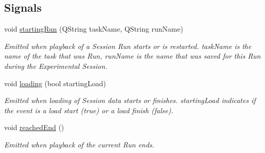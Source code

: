 \subsection*{Signals}
\begin{DoxyCompactItemize}
\item 
\hypertarget{class_picto_1_1_session_player_af6e2ed1e376e9d940c8f5554efbf753b}{void \hyperlink{class_picto_1_1_session_player_af6e2ed1e376e9d940c8f5554efbf753b}{starting\-Run} (Q\-String task\-Name, Q\-String run\-Name)}\label{class_picto_1_1_session_player_af6e2ed1e376e9d940c8f5554efbf753b}

\begin{DoxyCompactList}\small\item\em Emitted when playback of a Session Run starts or is restarted. task\-Name is the name of the task that was Run, run\-Name is the name that was saved for this Run during the Experimental Session. \end{DoxyCompactList}\item 
\hypertarget{class_picto_1_1_session_player_a7419758edb2920b408443d2683d8d029}{void \hyperlink{class_picto_1_1_session_player_a7419758edb2920b408443d2683d8d029}{loading} (bool starting\-Load)}\label{class_picto_1_1_session_player_a7419758edb2920b408443d2683d8d029}

\begin{DoxyCompactList}\small\item\em Emitted when loading of Session data starts or finishes. starting\-Load indicates if the event is a load start (true) or a load finish (false). \end{DoxyCompactList}\item 
\hypertarget{class_picto_1_1_session_player_a37f89e41b206df6d3e88611f9638a394}{void \hyperlink{class_picto_1_1_session_player_a37f89e41b206df6d3e88611f9638a394}{reached\-End} ()}\label{class_picto_1_1_session_player_a37f89e41b206df6d3e88611f9638a394}

\begin{DoxyCompactList}\small\item\em Emitted when playback of the current Run ends. \end{DoxyCompactList}\end{DoxyCompactItemize}
